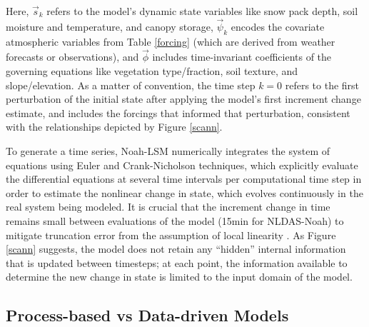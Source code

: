 Here, $\vec{s}_k$ refers to the model's dynamic state variables like snow pack depth, soil moisture and temperature, and canopy storage, $\vec{\psi}_k$ encodes the covariate atmospheric variables from Table \ref{forcing} (which are derived from weather forecasts or observations), and $\vec{\phi}$ includes time-invariant coefficients of the governing equations like vegetation type/fraction, soil texture, and slope/elevation. As a matter of convention, the time step $k=0$ refers to the first perturbation of the initial state after applying the model's first increment change estimate, and includes the forcings that informed that perturbation, consistent with the relationships depicted by Figure \ref{scann}.

To generate a time series, Noah-LSM numerically integrates the system of equations using Euler and Crank-Nicholson techniques, which explicitly evaluate the differential equations at several time intervals per computational time step in order to estimate the nonlinear change in state, which evolves continuously in the real system being modeled. It is crucial that the increment change in time remains small between evaluations of the model (15min for NLDAS-Noah) to mitigate truncation error from the assumption of local linearity \parencite{mitchell_multi-institution_2004} \parencite{cartwright_dynamics_1992}. As Figure \ref{scann} suggests, the model does not retain any ``hidden'' internal information that is updated between timesteps; at each point, the information available to determine the new change in state is limited to the input domain of the model.

\subsection{Process-based vs Data-driven Models}

